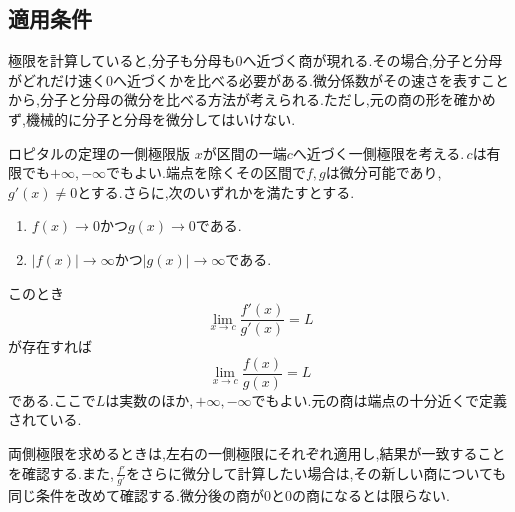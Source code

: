 \subsection{適用条件}

極限を計算していると,分子も分母も$0$へ近づく商が現れる.その場合,分子と分母がどれだけ速く$0$へ近づくかを比べる必要がある.微分係数がその速さを表すことから,分子と分母の微分を比べる方法が考えられる.ただし,元の商の形を確かめず,機械的に分子と分母を微分してはいけない.

\begin{theorem}{ロピタルの定理の一側極限版}
$x$が区間の一端$c$へ近づく一側極限を考える.\,$c$は有限でも$+\infty,-\infty$でもよい.端点を除くその区間で$f,g$は微分可能であり,\,$g'(x)\ne0$とする.さらに,次のいずれかを満たすとする.
\begin{enumerate}[label=(\roman*),leftmargin=*]
 \item $f(x)\to0$かつ$g(x)\to0$である.
 \item $|f(x)|\to\infty$かつ$|g(x)|\to\infty$である.
\end{enumerate}
このとき
\[
 \lim_{x\to c}\frac{f'(x)}{g'(x)}=L
\]
が存在すれば
\[
 \lim_{x\to c}\frac{f(x)}{g(x)}=L
\]
である.ここで$L$は実数のほか,\,$+\infty,-\infty$でもよい.元の商は端点の十分近くで定義されている.
\end{theorem}

両側極限を求めるときは,左右の一側極限にそれぞれ適用し,結果が一致することを確認する.また,\,$\frac{f'}{g'}$をさらに微分して計算したい場合は,その新しい商についても同じ条件を改めて確認する.微分後の商が$0$と$0$の商になるとは限らない.


